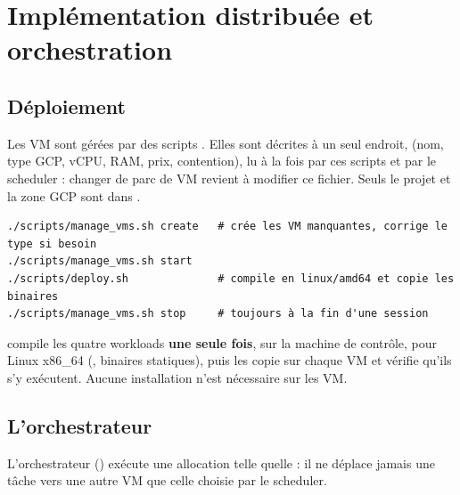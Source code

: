 \section{Implémentation distribuée et orchestration}
\label{sec:orchestration}

\subsection{Déploiement}

Les VM sont gérées par des scripts . Elles sont décrites à un seul
endroit,  (nom, type GCP, vCPU, RAM, prix, contention),
lu à la fois par ces scripts et par le scheduler : changer de parc de VM revient à
modifier ce fichier. Seuls le projet et la zone GCP sont dans
.

\begin{lstlisting}
./scripts/manage_vms.sh create   # crée les VM manquantes, corrige le type si besoin
./scripts/manage_vms.sh start
./scripts/deploy.sh              # compile en linux/amd64 et copie les binaires
./scripts/manage_vms.sh stop     # toujours à la fin d'une session
\end{lstlisting}

 compile les quatre workloads \textbf{une seule fois}, sur la
machine de contrôle, pour Linux x86\_64 (, binaires
statiques), puis les copie sur chaque VM et vérifie qu'ils s'y exécutent. Aucune
installation n'est nécessaire sur les VM.

\subsection{L'orchestrateur}

L'orchestrateur () exécute une allocation telle quelle :
il ne déplace jamais une tâche vers une autre VM que celle choisie par le scheduler.

